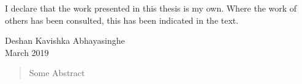 
\cleardoublepage{}
\begin{declaration}
    I declare that the work presented in this thesis is my own.
    Where the work of others has been consulted, this has been indicated in the text.
    \vspace*{1.5cm}
    \begin{flushright}
        Deshan Kavishka Abhayasinghe \\
        March 2019
    \end{flushright}
\end{declaration}

\begin{abstract}
   Some Abstract
\end{abstract}

\cleardoublepage{}\tableofcontents
\cleardoublepage{}\listoffigures
\cleardoublepage{}\listoftables

\dedication{}
